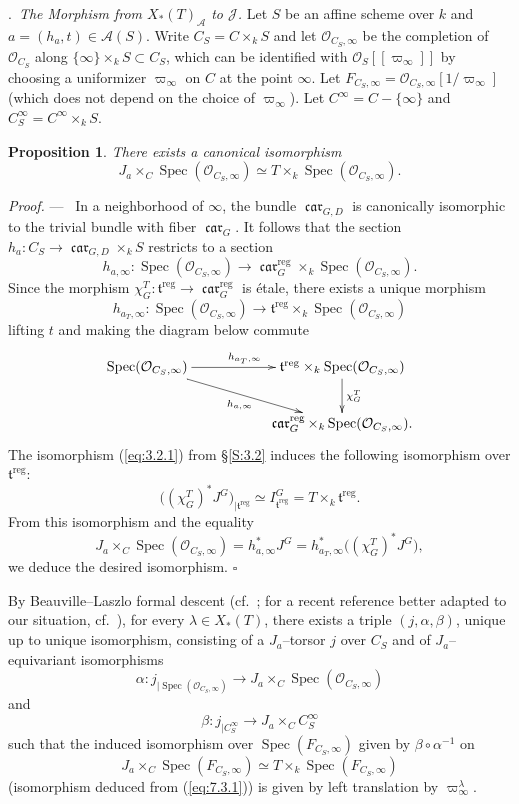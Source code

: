 \documentclass[12pt,a4paper,oneside,english,leqno]{smfart}
\makeatletter
\numberwithin{equation}{subsection}
\newcounter{theo}
\numberwithin{theo}{subsection}
\newenvironment{paragr}[1][]{\medskip\refstepcounter{subsection}%
  \par\noindent\hspace*{\parindent}\thesubsection.\ \emph{#1}%
  \@ifundefined{@empty}{}{}\ignorespaces}{\medskip}
\theoremstyle{plain}
\newtheorem{proposition}[theo]{Proposition}
\theoremstyle{definition}
\theoremstyle{remark}
\newenvironment{preuve}[1][]{\medskip\noindent\textit{Proof.} #1 ---\ }%
  {\hfill\ensuremath{\square}\medskip}
\DeclareMathOperator{\reg}{reg}
\DeclareMathOperator{\Spec}{Spec}
\DeclareMathOperator{\car}{\mathfrak{car}}
\newcommand{\Ac}{\mathcal{A}}
\newcommand{\Jc}{\mathcal{J}}
\newcommand{\tgo}{\mathfrak{t}}
\newcommand{\al}{\alpha}
\makeatother
\begin{document}
\begin{paragr}[The Morphism from $X_*(T)_{\Ac}$ to $\Jc$.]\label{S:7.3} Let $S$ be an affine scheme over $k$ and $a=(h_a,t)\in \Ac(S)$. Write $C_S=C\times_k S$ and let $\mathcal{O}_{C_S,\infty}$ be the completion of $\mathcal{O}_{C_S}$ along $\{\infty\}\times_k S \subset C_S$, which can be identified with $\mathcal{O}_{S}[[\varpi_{\infty}]]$ by choosing a uniformizer $\varpi_{\infty}$ on $C$ at the point $\infty$. Let $F_{C_S,\infty}=\mathcal{O}_{C_S,\infty}[1/\varpi_{\infty}]$ (which does not depend on the choice of $\varpi_{\infty}$). Let $C^\infty= C-\{\infty\}$ and $C^\infty_S =C^\infty\times_k S$.

\begin{proposition}\label{thm:7.3.1}
There exists a canonical isomorphism
\begin{equation}\label{eq:7.3.1}
   J_a \times_C  \Spec(\mathcal{O}_{C_S,\infty}) \simeq  T\times_k  \Spec(\mathcal{O}_{C_S,\infty}).
\end{equation}
\end{proposition}

\begin{preuve}
In a neighborhood of $\infty$, the bundle $\car_{G,D}$ is canonically isomorphic to the trivial bundle with fiber $\car_G$. It follows that the section $h_a : C_S \to \car_{G,D}\times_k S$ restricts to a section
$$h_{a,\infty} : \Spec(\mathcal{O}_{C_S,\infty}) \to \car^{\reg}_G\times_k \Spec(\mathcal{O}_{C_S,\infty}).$$
Since the morphism $\chi_G^T : \tgo^{\reg} \to \car^{\reg}_G$ is étale, there exists a unique morphism
$$h_{a_T,\infty} : \Spec(\mathcal{O}_{C_S,\infty}) \to \tgo^{\reg}\times_k \Spec(\mathcal{O}_{C_S,\infty})$$
lifting $t$ and making the diagram below commute
$$\xymatrix{
\Spec(\mathcal{O}_{C_S,\infty}) \ar[rr]^{h_{a_T,\infty}} \ar[drr]_{h_{a,\infty}} & &  \tgo^{\reg}\times_k \Spec(\mathcal{O}_{C_S,\infty}) \ar[d]^{\chi_G^T} \\
& & \car^{\reg}_G\times_k \Spec(\mathcal{O}_{C_S,\infty}).
}$$
The isomorphism (\ref{eq:3.2.1}) from §\ref{S:3.2} induces the following isomorphism over $\tgo^{\reg}$:
$$\bigl((\chi_G^T)^*J^G\bigr)_{|\tgo^{\reg}}\simeq I^G_{\tgo^{\reg}}=T\times_k \tgo^{\reg}.$$
From this isomorphism and the equality
$$ J_a \times_C  \Spec(\mathcal{O}_{C_S,\infty}) = h_{a,\infty}^*J^G = h_{a_T,\infty}^*\bigl((\chi_G^T)^*J^G\bigr),$$
we deduce the desired isomorphism.
\end{preuve}

By Beauville--Laszlo formal descent (cf.\ \cite{Beauville-Laszlo}; for a recent reference better adapted to our situation, cf.\ \cite{Heinloth}), for every $\lambda \in X_*(T)$, there exists a triple $(j,\al,\beta)$, unique up to unique isomorphism, consisting of a $J_a$–torsor $j$ over $C_S$ and of $J_a$–equivariant isomorphisms
$$\al : j_{|\Spec(\mathcal{O}_{C_S,\infty}) } \to J_a \times_C  \Spec(\mathcal{O}_{C_S,\infty})$$
and
$$\beta : j_{|C^\infty_S} \to J_a \times_C   C_S^\infty$$
such that the induced isomorphism over $\Spec(F_{C_S,\infty})$ given by $\beta\circ \al^{-1}$ on
$$J_a \times_C  \Spec(F_{C_S,\infty}) \simeq T\times_k  \Spec(F_{C_S,\infty})$$
(isomorphism deduced from (\ref{eq:7.3.1})) is given by left translation by $\varpi_\infty^\lambda$.


\end{paragr}
\end{document}
